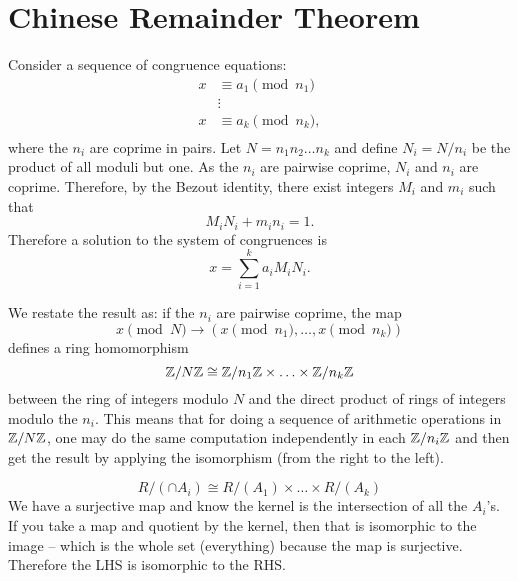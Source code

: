 \section{Chinese Remainder Theorem}

Consider a sequence of congruence equations: 
\begin{align*}
x &\equiv a_1 \pmod{n_1}\\
&\vdots \\
x &\equiv a_k  \pmod{n_k},\\
\end{align*}where the $n_i$ are coprime in pairs. Let $N = n_1 n_2 \hdots n_k$ and define $N_i = N/n_i$ be the product of all moduli but one. As the $n_i$ are pairwise coprime, $N_i$ and $n_i$ are coprime. Therefore, by the Bezout identity, there exist integers $M_i$ and $m_i$ such that $$M_i N_i + m_i n_i = 1.$$ Therefore a solution to the system of congruences is $$x = \sum_{i=1}^k a_iM_iN_i.$$
\begin{definition}
We restate the result as: if the $n_i$ are pairwise coprime, the map 
$$ x \pmod{N} \rightarrow (x\pmod{n_1},\hdots,x\pmod{n_k})$$ defines a ring homomorphism
$$\mathbb{Z} /N \mathbb{Z} \cong \mathbb{Z} /n_1\mathbb{Z} \times \hdots \times \mathbb{Z}/n_k\mathbb{Z}$$between the ring of integers modulo $N$ and the direct product of rings of integers modulo the $n_i$. This means that for doing a sequence of arithmetic operations in $\mathbb{Z}/N\mathbb{Z}$, one may do the same computation independently in each $\mathbb{Z}/n_i\mathbb{Z}$ and then get the result by applying the isomorphism (from the right to the left). 
\end{definition}

$$R /(\cap A_i) \cong R /(A_1) \times \hdots \times R/(A_k)$$We have a surjective map and know the kernel is the intersection of all the $A_i$'s. If you take a map and quotient by the kernel, then that is isomorphic to the image -- which is the whole set (everything) because the map is surjective. Therefore the LHS is isomorphic to the RHS.